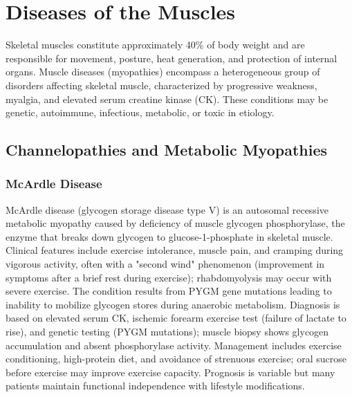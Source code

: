 \chapter{Diseases of the Muscles}
\label{ch:muscles}
Skeletal muscles constitute approximately 40\% of body weight and are responsible for movement, posture, heat generation, and protection of internal organs. Muscle diseases (myopathies) encompass a heterogeneous group of disorders affecting skeletal muscle, characterized by progressive weakness, myalgia, and elevated serum creatine kinase (CK). These conditions may be genetic, autoimmune, infectious, metabolic, or toxic in etiology.

\section{Channelopathies and Metabolic Myopathies}








\label{sec:Channelopathies and Metabolic Myopathies}

\subsection{McArdle Disease}
\label{sec:McArdle Disease}
McArdle disease (glycogen storage disease type V) is an autosomal recessive metabolic myopathy caused by deficiency of muscle glycogen phosphorylase, the enzyme that breaks down glycogen to glucose-1-phosphate in skeletal muscle. Clinical features include exercise intolerance, muscle pain, and cramping during vigorous activity, often with a "second wind" phenomenon (improvement in symptoms after a brief rest during exercise); rhabdomyolysis may occur with severe exercise. The condition results from PYGM gene mutations leading to inability to mobilize glycogen stores during anaerobic metabolism. Diagnosis is based on elevated serum CK, ischemic forearm exercise test (failure of lactate to rise), and genetic testing (PYGM mutations); muscle biopsy shows glycogen accumulation and absent phosphorylase activity. Management includes exercise conditioning, high-protein diet, and avoidance of strenuous exercise; oral sucrose before exercise may improve exercise capacity. Prognosis is variable but many patients maintain functional independence with lifestyle modifications.

